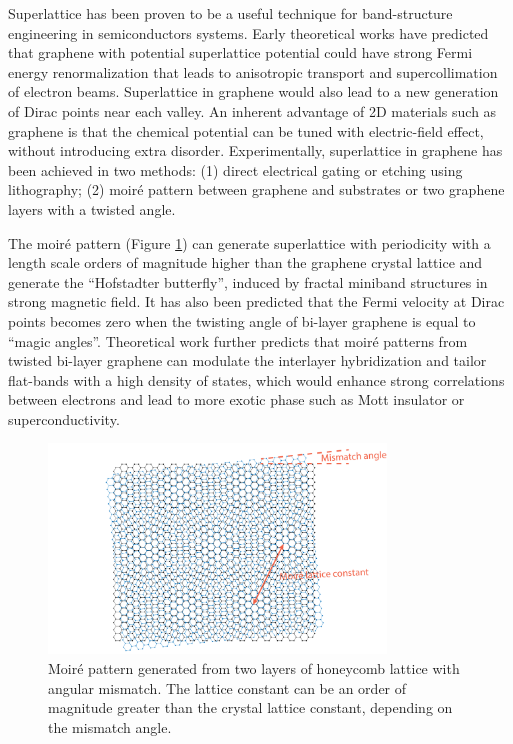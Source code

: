 \documentclass[pdflatex, sectionletters, 12pt]{pittetd}    %
\begin{document}
Superlattice has been proven to be a useful technique for band-structure engineering in semiconductors systems\cite{tsu2010superlattice}. Early theoretical works have predicted that graphene with potential superlattice potential could have strong Fermi energy renormalization that leads to anisotropic transport\cite{park2008anisotropic} and supercollimation of electron beams\cite{park2008electron}. Superlattice in graphene would also lead to a new generation of Dirac points near each valley\cite{park2008new}. An inherent advantage of 2D materials such as graphene is that the chemical potential can be tuned with electric-field effect, without introducing extra disorder\cite{cao2018correlated}. Experimentally, superlattice in graphene has been achieved in two methods: (1) direct electrical gating or etching using lithography\cite{dubey2013tunable, forsythe2018band, jessen2019lithographic}; (2) moir{\'e} pattern between graphene and substrates\cite{dean2013hofstadter, hunt2013massive, ponomarenko2013cloing} or two graphene layers with a twisted angle\cite{cao2016superlattice, cao2018correlated, cao2018unconventional, chen2018gate, yankowitz2018dynamic}. 

The moir{\'e} pattern (Figure \ref{FIG:Moire}) can generate superlattice with periodicity with a length scale orders of magnitude higher than the graphene crystal lattice and generate the ``Hofstadter butterfly'', induced by fractal miniband structures in strong magnetic field\cite{dean2013hofstadter, hunt2013massive, ponomarenko2013cloing}. It has also been predicted\cite{bistritzer2011moire} that the Fermi velocity at Dirac points becomes zero when the twisting angle of bi-layer graphene is equal to ``magic angles''. Theoretical work\cite{bistritzer2011moire, suarez2010flat, lopes2012continuum} further predicts that moir{\'e} patterns from twisted bi-layer graphene can modulate the interlayer hybridization and tailor flat-bands with a high density of states, which would enhance strong correlations between electrons and lead to more exotic phase such as Mott insulator\cite{cao2016superlattice, cao2018correlated, chen2018gate} or superconductivity\cite{cao2018unconventional}.

\begin{figure}[h!]
	\centering
	\includegraphics[width=0.8\textwidth]{Drawing/Moire.pdf}
	\caption{Moir{\'e} pattern generated from two layers of honeycomb lattice with angular mismatch. The lattice constant can be an order of magnitude greater than the crystal lattice constant, depending on the mismatch angle.}
	\label{FIG:Moire}
\end{figure}
\end{document}
